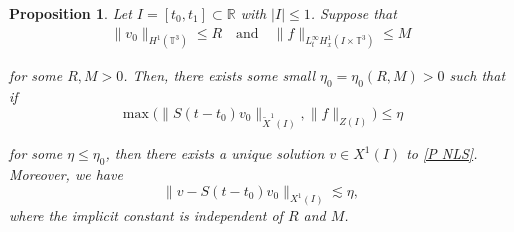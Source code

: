 \documentclass[letterpaper, 11pt,  reqno]{amsart}
\newtheorem{proposition}[theorem]{Proposition}
\newcommand{\1}{\hspace{0.5mm}\text{I}\hspace{0.5mm}}
\newcommand{\noi}{\noindent}
\newcommand{\R}{\mathbb{R}}
\newcommand{\T}{\mathbb{T}}
\newcommand{\wt}{\widetilde}
\newcommand{\les}{\lesssim}
\numberwithin{equation}{section}
\numberwithin{theorem}{section}
\begin{document}
\begin{proposition}\label{Prop:loc}
Let 
$I =[t_0,t_1]\subset\R$ with $|I| \le 1$.
Suppose that 
\begin{align*}
\| v_0\|_{H^1(\T^3) }  \leq R \quad \text{and} \quad
\| f\|_{L^\infty_t H^1_x  (I\times \T^3)}\leq M
\end{align*}



\noi
for some $R,M>0$.
Then, there exists some small $\eta_0 = \eta_0(R, M) > 0$
such that if
\begin{equation*}
\max \big( \|S(t-t_0)v_0\|_{\wt X^1(I)},    \|f\|_{Z(I)} \big) \leq \eta
\end{equation*}


\noi
for some $\eta\leq  \eta_0$,
then
 there exists a unique solution
 $v\in X^1(I)$ 
to \eqref{P NLS}. Moreover, we have
\begin{equation}
\label{eq_cnt0}
    \|v-S(t-t_0)v_0\|_{X^1(I)}
    \les
    \eta,
\end{equation}
where the implicit constant is independent of $R$ and $M$.


%



\end{proposition}
\end{document}
